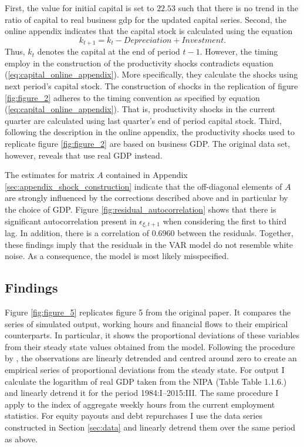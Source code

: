 First, the value for initial capital is set to $22.53$ such that there is no trend in the ratio of capital to real business gdp for the updated capital series. Second, the online appendix indicates that the capital stock is calculated using the equation
\begin{equation} 
	\label{eq:capital_online_appendix}
	k_{t+1} = k_{t} - Depreciation + Investment.
\end{equation} 
Thus, ${k}_t$ denotes the capital at the end of period $t-1$. However, the timing \citeauthor{JERMANNfinancial} employ in the construction of the productivity shocks contradicts equation (\ref{eq:capital_online_appendix}). More specifically, they  calculate the shocks using next period's capital stock. The construction of shocks in the replication of figure \ref{fig:figure_2} adheres to the timing convention as specified by equation (\ref{eq:capital_online_appendix}). That is, productivity shocks in the current quarter are calculated using last quarter's end of period capital stock. Third, following the description in the online appendix, the productivity shocks used to replicate figure \ref{fig:figure_2} are based on business GDP. The original data set, however, reveals that \citeauthor{JERMANNfinancial} use real GDP instead. 

The estimates for matrix $A$  contained in Appendix \ref{sec:appendix_shock_construction} indicate that the off-diagonal elements of $A$ are strongly influenced by the corrections described above and in particular by the choice of GDP. 
Figure \ref{fig:residual_autocorrelation} shows that there is significant autocorrelation present in ${\epsilon}_{\xi,t+1}$ when considering the first to third lag. In addition, there is a correlation of $0.6960$ between the residuals. Together, these findings imply that the residuals in the VAR model do not resemble white noise. As a consequence, the model is most likely misspecified.


\subsection{Findings}
\label{sec:findings}



Figure \ref{fig:figure_5} replicates figure 5 from the original paper. It compares  the series of simulated output, working hours and financial flows to their empirical counterparts. In particular, it shows the proportional deviations of these variables from their steady state values obtained from the model. Following the procedure by \citeauthor{JERMANNfinancial}, the observations are linearly detrended and centred around zero to create an empirical series of proportional deviations from the steady state. For output I calculate the logarithm of real GDP taken from the NIPA (Table Table 1.1.6.) and linearly detrend it for the period 1984:I--2015:III. The same procedure I apply to the index of aggregate weekly hours from the current employment statistics. For equity payouts and debt repurchases I use the data series constructed in Section \ref{sec:data} and linearly detrend them over the same period as above.
